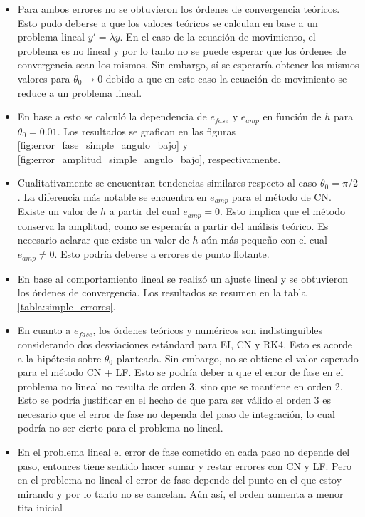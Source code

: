 \documentclass[aps,prb,twocolumn,superscriptaddress,floatfix,longbibliography]{revtex4-2}
\newcounter{para}
\begin{document}
\begin{itemize}
  \item Para ambos errores no se obtuvieron los órdenes de convergencia teóricos. Esto pudo deberse a que los valores teóricos se calculan en base a un problema lineal $y' = \lambda y$. En el caso de la ecuación de movimiento, el problema es no lineal y por lo tanto no se puede esperar que los órdenes de convergencia sean los mismos. Sin embargo, sí se esperaría obtener los mismos valores para $\theta_0 \rightarrow 0$ debido a que en este caso la ecuación de movimiento se reduce a un problema lineal.
  \item En base a esto se calculó la dependencia de $e_{fase}$ y $e_{amp}$ en función de $h$ para $\theta_0 = 0.01$. Los resultados se grafican en las figuras \ref{fig:error_fase_simple_angulo_bajo} y \ref{fig:error_amplitud_simple_angulo_bajo}, respectivamente.
  \item Cualitativamente se encuentran tendencias similares respecto al caso $\theta_0 = \pi/2$. La diferencia más notable se encuentra en $e_{amp}$ para el método de CN. Existe un valor de $h$ a partir del cual $e_{amp} = 0$. Esto implica que el método conserva la amplitud, como se esperaría a partir del análisis teórico. Es necesario aclarar que existe un valor de $h$ aún más pequeño con el cual $e_{amp} \neq 0$. Esto podría deberse a errores de punto flotante.
  \item En base al comportamiento lineal se realizó un ajuste lineal y se obtuvieron los órdenes de convergencia. Los resultados se resumen en la tabla \ref{tabla:simple_errores}.
  


  \item En cuanto a $e_{fase}$, los órdenes teóricos y numéricos son indistinguibles considerando dos desviaciones estándard para EI, CN y RK4. Esto es acorde a la hipótesis sobre $\theta_0$ planteada. Sin embargo, no se obtiene el valor esperado para el método CN + LF. Esto se podría deber a que el error de fase en el problema no lineal no resulta de orden 3, sino que se mantiene en orden 2. Esto se podría justificar en el hecho de que para ser válido el orden 3 es necesario que el error de fase no dependa del paso de integración, lo cual podría no ser cierto para el problema no lineal.
  \item En el problema lineal el error de fase cometido en cada paso no depende del paso, entonces tiene sentido hacer sumar y restar errores con CN y LF. Pero en el problema no lineal el error de fase depende del punto en el que estoy mirando y por lo tanto no se cancelan. Aún así, el orden aumenta a menor tita inicial


\end{itemize}
\end{document}
